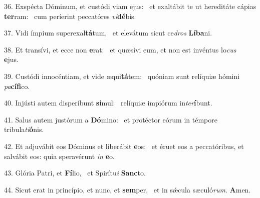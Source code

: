 36. Exspécta Dóminum, et custódi viam ejus: \dag\  et exaltábit te ut hereditáte cápias \textbf{ter}ram: \ast\  cum períerint peccatóres \textit{vi}\textbf{dé}bis.\

37. Vidi ímpium superexal\textbf{tá}tum, \ast\  et elevátum sicut ce\textit{dros} \textbf{Lí}\textbf{ba}ni.\

38. Et transívi, et ecce non \textbf{e}rat: \ast\  et quæsívi eum, et non est invéntus lo\textit{cus} \textbf{e}jus.\

39. Custódi innocéntiam, et vide æqui\textbf{tá}tem: \ast\  quóniam sunt relíquiæ hómini \textit{pa}\textbf{cí}\textbf{fi}co.\

40. Injústi autem disperíbunt \textbf{si}mul: \ast\  relíquiæ impiórum in\textit{ter}\textbf{í}bunt.\

41. Salus autem justórum a \textbf{Dó}mino: \ast\  et protéctor eórum in témpore tribula\textit{ti}\textbf{ó}nis.\

42. Et adjuvábit eos Dóminus et liberábit \textbf{e}os: \ast\  et éruet eos a peccatóribus, et salvábit eos: quia speravérunt \textit{in} \textbf{e}o.\

43. Glória Patri, et \textbf{Fí}lio, \ast\  et Spirítu\textit{i} \textbf{Sanc}to.\

44. Sicut erat in princípio, et nunc, et \textbf{sem}per, \ast\  et in sǽcula sæculó\textit{rum}. \textbf{A}men.\

